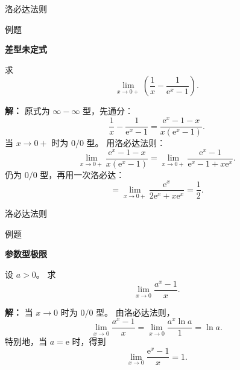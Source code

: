 \documentclass[aspectratio=169,10pt,fontset=fandol]{ctexbeamer}
\newcommand{\ee}{\mathrm{e}}
\begin{document}
\begin{frame}[t,fragile]{洛必达法则}
\normalsize
\begin{block}{例题}
{\normalsize
\textbf{差型未定式}\par

求
\[
\lim_{x\to0+}\left(\frac1x-\frac1{\ee^x-1}\right).
\]

}
\end{block}
\pause
{\normalsize
\textbf{解：}
原式为 $\infty-\infty$ 型，先通分：
\[
\frac1x-\frac1{\ee^x-1}
=\frac{\ee^x-1-x}{x(\ee^x-1)}.
\]
当 $x\to0+$ 时为 $0/0$ 型。 用洛必达法则：
\[
\lim_{x\to0+}\frac{\ee^x-1-x}{x(\ee^x-1)}
=\lim_{x\to0+}\frac{\ee^x-1}{\ee^x-1+x\ee^x}.
\]
仍为 $0/0$ 型，再用一次洛必达：
\[
=\lim_{x\to0+}\frac{\ee^x}{2\ee^x+x\ee^x}
=\frac12.
\]

}
\end{frame}
\begin{frame}[t,fragile]{洛必达法则}
\normalsize
\begin{block}{例题}
{\normalsize
\textbf{参数型极限}\par

设 $a>0$。 求
\[
\lim_{x\to0}\frac{a^x-1}{x}.
\]

}
\end{block}
\pause
{\normalsize
\textbf{解：}
当 $x\to0$ 时为 $0/0$ 型。 由洛必达法则，
\[
\lim_{x\to0}\frac{a^x-1}{x}
=\lim_{x\to0}\frac{a^x\ln a}{1}
=\ln a.
\]
特别地，当 $a=\ee$ 时，得到
\[
\lim_{x\to0}\frac{\ee^x-1}{x}=1.
\]

}
\end{frame}
\end{document}
